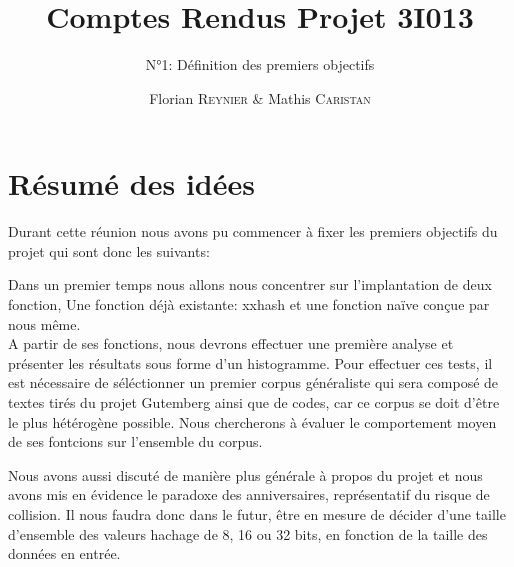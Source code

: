 \documentclass[final,article,10pt]{scrartcl}
\begin{document}
%
\title{Comptes Rendus Projet 3I013}
\subtitle{N°1: Définition des premiers objectifs}
\author{Florian \textsc{Reynier} \& Mathis \textsc{Caristan}}
%
\date{}

\maketitle

\section*{Résumé des idées}
	Durant cette réunion nous avons pu commencer à fixer les premiers objectifs du projet qui sont donc les suivants:\\
    \par Dans un premier temps nous allons nous concentrer sur l'implantation de deux fonction, Une fonction déjà existante: xxhash et une fonction naïve conçue par nous même.\\
    A partir de ses fonctions, nous devrons effectuer une première analyse et présenter les résultats sous forme d'un histogramme. Pour effectuer ces tests, il est nécessaire de séléctionner un premier corpus généraliste qui sera composé de textes tirés du projet Gutemberg ainsi que de codes, car ce corpus se doit d'être le plus hétérogène possible. Nous chercherons à évaluer le comportement moyen de ses fontcions sur l'ensemble du corpus.\\
    \par Nous avons aussi discuté de manière plus générale à propos du projet et nous avons mis en évidence le paradoxe des anniversaires, représentatif du risque de collision. Il nous faudra donc dans le futur, être en mesure de décider d'une taille d'ensemble des valeurs hachage de 8, 16 ou 32 bits, en fonction de la taille des données en entrée.
	
	
	


%
\end{document}
